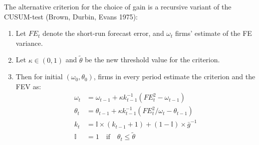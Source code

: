 \documentclass[11pt]{article}
\renewcommand{\[}{\begin{equation}}
\renewcommand{\]}{\end{equation}}
\begin{document}
The alternative criterion for the choice of gain is a recursive variant of the CUSUM-test (Brown, Durbin, Evans 1975):
\begin{enumerate}
\item Let $FE_t$ denote the short-run forecast error, and $\omega_t$ firms' estimate of the FE variance.
\item Let $\kappa \in (0,1)$ and $\tilde{\theta}$ be the new threshold value for the criterion.
\item Then for initial $(\omega_0, \theta_0)$, firms in every period estimate the criterion and the FEV as:
\begin{align}
 \omega_t & =  \omega_{t-1} + \kappa k_{t-1}^{-1}(FE_t^2 -\omega_{t-1})\\
\theta_t & =  \theta_{t-1} + \kappa k_{t-1}^{-1}(FE_t^2/\omega_t -\theta_{t-1})\\
k_t & = \mathbb{I}\times(k_{t-1}+1) + (1-\mathbb{I}) \times \bar{g}^{-1} \\
\mathbb{I} & = 1 \quad \text{if} \quad  \theta_t \leq \tilde{\theta}
\end{align}
\end{enumerate}

\newpage
\end{document}
